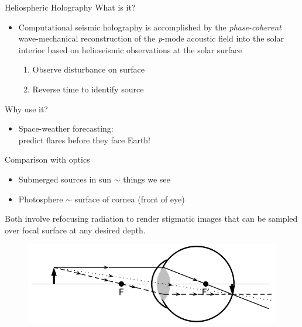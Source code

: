 \documentclass{beamer}
\begin{document}

\begin{frame}{Heliospheric Holography}
What is it?
\begin{itemize}
    \item \large\textcolor{mangotango}{Computational seismic
        holography is accomplished by the \emph{phase-coherent}
        wave-mechanical reconstruction of the \emph{p}-mode
        acoustic field into the solar interior based on helioseismic
        observations at the solar surface}
        \normalsize
        \begin{enumerate}
            \item Observe disturbance on surface
            \item Reverse time to identify source
        \end{enumerate}
\end{itemize}
Why use it?
\begin{itemize}
    \item Space-weather forecasting:\\
    predict flares before they face Earth!
\end{itemize}
\end{frame}
\begin{frame}{Comparison with optics}
    \begin{itemize}
        \item Submerged sources in sun $\sim$ things we see
        \item Photosphere $\sim$ surface of cornea (front of eye)
    \end{itemize}
    Both involve refocusing radiation to render stigmatic images
    that can be sampled over focal surface at any desired depth.
    \begin{figure}
        \includegraphics[width=\textwidth]{eye.png}
    \end{figure}
\end{frame}
\end{document}
